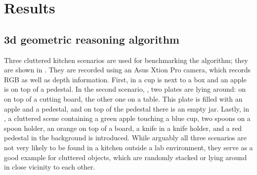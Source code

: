 \section{Results}
\label{sec:action_results}




\subsection{3d geometric reasoning algorithm}

Three cluttered kitchen scenarios are used for benchmarking the algorithm; they are shown in .
They are recorded using an Asus Xtion Pro camera, which records RGB as well as depth information.
First, in  a cup is next to a box and an apple is on top of a pedestal.
In the second scenario, , two plates are lying around: on on top of a cutting board, the other one on a table.
This plate is filled with an apple and a pedestal, and on top of the pedestal there is an empty jar.
Lastly, in , a cluttered scene containing a green apple touching a blue cup, two spoons on a spoon holder, an orange on top of a board, a knife in a knife holder, and a red pedestal in the background is introduced.
While arguably all three scenarios are not very likely to be found in a kitchen outside a lab environment, they serve as a good example for cluttered objects, which are randomly stacked or lying around in close vicinity to each other.

